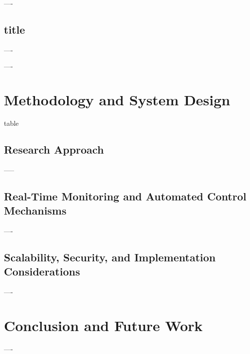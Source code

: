 \documentclass[conference]{IEEEtran}
\begin{document}
----

\subsection{title}

----

\vspace{5pt}
\noindent
----
\vspace{5pt}

\section{Methodology and System Design}

table


\subsection{Research Approach}

-----

\subsection{Real-Time Monitoring and Automated Control Mechanisms}

----

\subsection{Scalability, Security, and Implementation Considerations}

----

\section{Conclusion and Future Work}

----



\end{document}
